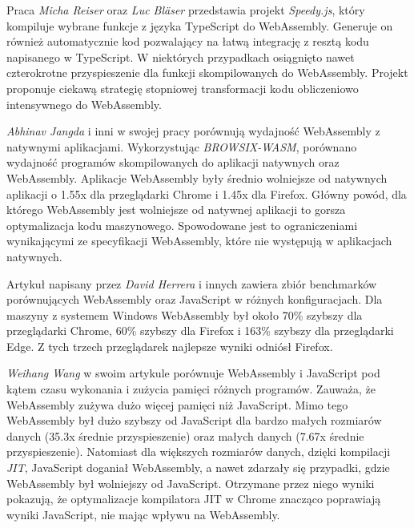 \documentclass[language=polish,type=master]{aghmodern}
\begin{document}
Praca \cite{wasm_speedyjs} \emph{Micha Reiser} oraz \emph{Luc Bl\"{a}ser} przedstawia projekt \emph{Speedy.js}, który kompiluje wybrane funkcje z języka TypeScript\footnotemark{} do WebAssembly.
Generuje on również automatycznie kod pozwalający na łatwą integrację z resztą kodu napisanego w TypeScript.
W niektórych przypadkach osiągnięto nawet czterokrotne przyspieszenie dla funkcji skompilowanych do WebAssembly.
Projekt proponuje ciekawą strategię stopniowej transformacji kodu obliczeniowo intensywnego do WebAssembly.

\emph{Abhinav Jangda} i inni w swojej pracy \cite{wasm_native} porównują wydajność WebAssembly z natywnymi aplikacjami.
Wykorzystując \emph{BROWSIX-WASM}\footnotemark{}, porównano wydajność programów skompilowanych do aplikacji natywnych oraz WebAssembly.
Aplikacje WebAssembly były średnio wolniejsze od natywnych aplikacji o 1.55x dla przeglądarki Chrome i 1.45x dla Firefox.
Główny powód, dla którego WebAssembly jest wolniejsze od natywnej aplikacji to gorsza optymalizacja kodu maszynowego.
Spowodowane jest to ograniczeniami wynikającymi ze specyfikacji WebAssembly, które nie występują w aplikacjach natywnych.

Artykuł \cite{wasm_js_bench} napisany przez \emph{David Herrera} i innych zawiera zbiór benchmarków porównujących WebAssembly oraz JavaScript w różnych konfiguracjach.
Dla maszyny z systemem Windows WebAssembly był około 70\% szybszy dla przeglądarki Chrome, 60\% szybszy dla Firefox i 163\% szybszy dla przeglądarki Edge.
Z tych trzech przeglądarek najlepsze wyniki odniósł Firefox.

\emph{Weihang Wang} w swoim artykule \cite{wasm_js_bench2} porównuje WebAssembly i JavaScript pod kątem czasu wykonania i zużycia pamięci różnych programów.
Zauważa, że WebAssembly zużywa dużo więcej pamięci niż JavaScript.
Mimo tego WebAssembly był dużo szybszy od JavaScript dla bardzo małych rozmiarów danych (35.3x średnie przyspieszenie) oraz małych danych (7.67x średnie przyspieszenie).
Natomiast dla większych rozmiarów danych, dzięki kompilacji \emph{JIT}\footnotemark{}, JavaScript doganiał WebAssembly, a nawet zdarzały się przypadki, gdzie WebAssembly był wolniejszy od JavaScript.
Otrzymane przez niego wyniki pokazują, że optymalizacje kompilatora JIT w Chrome znacząco poprawiają wyniki JavaScript, nie mając wpływu na WebAssembly.
\end{document}
